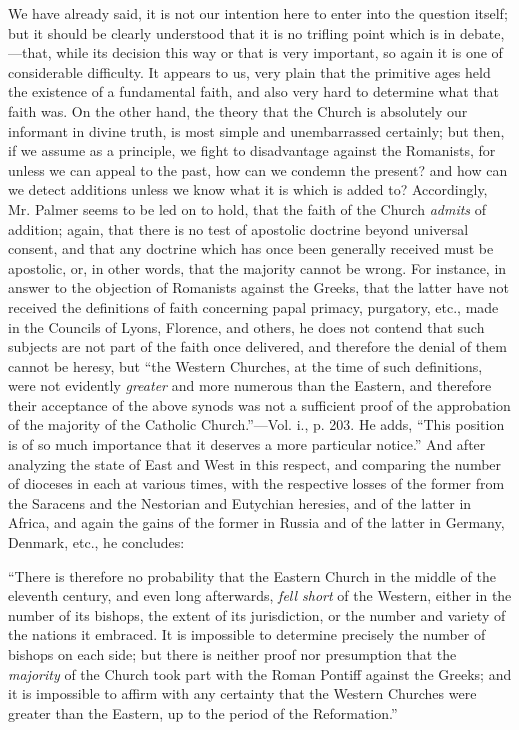 We have already said, it is not our intention
here to enter into the question itself; but it should be clearly
understood that it is no trifling point which is in debate,—that,
while its decision this way or that is very important, so again it is
one of considerable difficulty. It appears to us, very plain that the
primitive ages held the existence of a fundamental faith, and also
very hard to determine what that faith was. On the other hand,
the theory that the Church is absolutely our informant in divine
truth, is most simple and unembarrassed certainly; but then, if we
assume as a principle, we fight to disadvantage against the Romanists,
for unless we can appeal to the past, how can we condemn the present?
and how can we detect additions unless we know what it is which is
added to? Accordingly, Mr. Palmer seems to be led on to hold, that the
faith of the Church \emph{admits} of addition; again, that there is no
test of apostolic doctrine beyond universal consent, and that any
doctrine which has once been generally received must be apostolic, or,
in other words, that the majority cannot be wrong. For instance, in
answer to the objection of Romanists against the Greeks, that the
latter have not received the definitions of faith concerning papal
primacy, purgatory, etc., made in the Councils of Lyons, Florence, and
others, he does not contend that such subjects are not part of the
faith once delivered, and therefore the denial of them cannot be
heresy, but ``the Western Churches, at the time of such definitions,
were not evidently \emph{greater} and more numerous than the Eastern,
and therefore their acceptance of the above synods was not a
sufficient proof of the approbation of the majority of the Catholic
Church.''—Vol. i., p. 203. He adds, ``This position is of so much
importance that it deserves a more particular notice.'' And after
analyzing the state of East and West in this respect, and comparing
the number of dioceses in each at various times, with the respective
losses of the former from the Saracens and the Nestorian and Eutychian
heresies, and of the latter in Africa, and again the gains of the
former in Russia and of the latter in Germany, Denmark, etc., he
concludes:

``There
is therefore no probability that the Eastern Church in the middle of
the eleventh century, and even long afterwards, \emph{fell short} of
the Western, either in the number of its bishops, the extent of its
jurisdiction, or the number and variety of the nations it embraced. It
is impossible to determine precisely the number of bishops on each
side; but there is neither proof nor presumption that the \emph{majority}
of the Church took part with the Roman Pontiff against the Greeks; and
it is impossible to affirm with any certainty that the Western
Churches were greater than the Eastern, up to the period of the
Reformation.''

